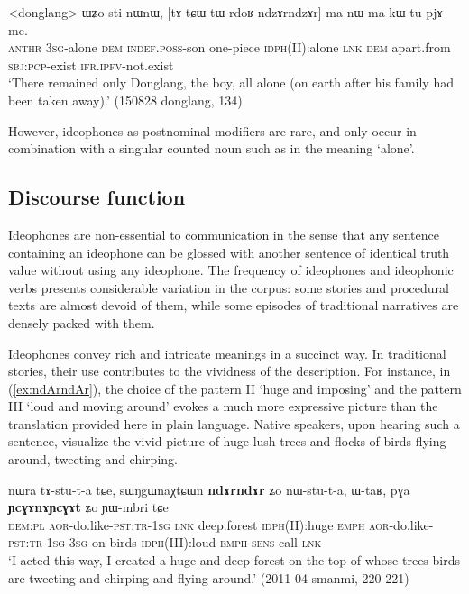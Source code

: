 \begin{exe}
\ex \label{ex:ndzArndzAr.ma}
\gll  <donglang> ɯʑo-sti nɯnɯ, [tɤ-tɕɯ tɯ-rdoʁ ndzɤrndzɤr] ma nɯ ma kɯ-tu pjɤ-me. \\
\textsc{anthr} \textsc{3sg}-alone \textsc{dem} \textsc{indef}.\textsc{poss}-son one-piece \textsc{idph}(II):alone \textsc{lnk} \textsc{dem} apart.from \textsc{sbj}:\textsc{pcp}-exist \textsc{ifr}.\textsc{ipfv}-not.exist \\
\glt `There remained only Donglang, the boy, all alone (on earth after his family had been taken away).' (150828 donglang, 134)
\end{exe}

However, ideophones as postnominal modifiers are rare, and only occur in combination with a singular counted noun such as  in the meaning `alone'. 

\subsection{Discourse function}
 Ideophones are non-essential to communication in the sense that any sentence containing an ideophone can be glossed with another sentence of identical truth value without using any ideophone. The frequency of ideophones and ideophonic verbs presents considerable variation  in the corpus: some stories and procedural texts are almost devoid of them, while some episodes of traditional narratives are densely packed with them.
  
Ideophones convey rich and intricate meanings in a succinct way. In traditional stories, their use contributes to the vividness of the description. For instance, in  (\ref{ex:ndArndAr}), the choice of the pattern II  `huge and imposing'	and 	the pattern III  `loud and moving around' evokes  a much more expressive picture than the  translation provided here in plain language. Native speakers, upon hearing such a sentence, visualize the vivid picture of huge lush trees and flocks of birds flying around, tweeting and chirping.

\begin{exe}
\ex \label{ex:ndArndAr}
 \gll nɯra tɤ-stu-t-a tɕe,  sɯŋgɯnaχtɕɯn \textbf{ndɤrndɤr} ʑo nɯ-stu-t-a, ɯ-taʁ,  pɣa \textbf{ɲcɣɤnɤɲcɣɤt} ʑo ɲɯ-mbri tɕe \\
\textsc{dem}:\textsc{pl} \textsc{aor}-do.like-\textsc{pst}:\textsc{tr}-\textsc{1sg} \textsc{lnk} deep.forest \textsc{idph}(II):huge \textsc{emph} \textsc{aor}-do.like-\textsc{pst}:\textsc{tr}-\textsc{1sg} \textsc{3sg}-on birds \textsc{idph}(III):loud \textsc{emph} \textsc{sens}-call \textsc{lnk} \\
\glt `I acted this way, I created a huge and deep forest on the top of whose trees birds are tweeting and chirping and flying around.' (2011-04-smanmi, 220-221)
\end{exe}


